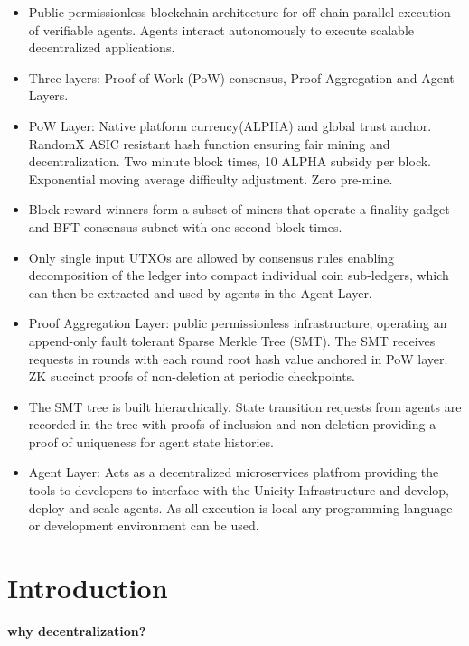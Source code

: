 \documentclass{article}
\begin{document}
\begin{itemize}

  \setlength{\leftmargin}{1em}
  
 \item Public permissionless blockchain architecture for off-chain parallel execution of verifiable agents. Agents interact autonomously to execute scalable decentralized applications.
 \item  Three layers: Proof of Work (PoW) consensus, Proof Aggregation and Agent Layers.
\item PoW Layer: Native platform currency(ALPHA) and global trust anchor. RandomX ASIC resistant hash function ensuring fair mining and decentralization. Two minute block times, 10 ALPHA subsidy per block. Exponential moving average difficulty adjustment. Zero pre-mine.
\item  Block reward winners form a subset of miners that operate a finality gadget and BFT consensus subnet with one second block times. 
\item Only single input UTXOs are allowed by consensus rules enabling decomposition of the ledger into compact individual coin sub-ledgers, which can then be extracted and used by agents in the Agent Layer.
\item Proof Aggregation Layer: public permissionless infrastructure, operating an append-only fault tolerant Sparse Merkle Tree (SMT). The SMT receives requests in rounds with each round root hash value anchored in PoW layer. ZK succinct proofs of non-deletion at periodic checkpoints.
\item The SMT tree is built hierarchically. State transition requests from agents are recorded in the tree with proofs of inclusion and non-deletion providing a proof of uniqueness for agent state histories.
\item Agent Layer: Acts as a decentralized microservices platfrom providing the tools to developers to interface with the Unicity Infrastructure and develop, deploy and scale agents. As all execution is local any programming language or development environment can be used.
\end{itemize}


\section{Introduction}


\textbf{why decentralization?}
\vspace{2mm}
\end{document}
